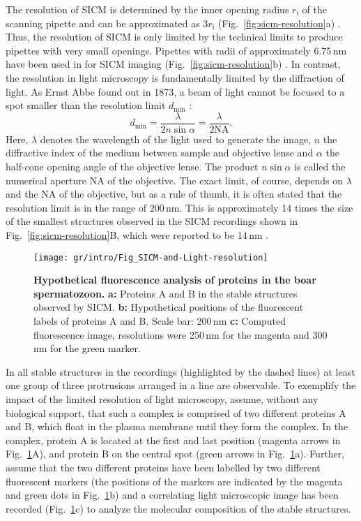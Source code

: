 The resolution of SICM is determined by the inner opening radius
$r_\mathrm{i}$ of the scanning pipette and can be approximated as
$3r_\mathrm{i}$ (Fig.~\ref{fig:sicm-resolution}a)
\cite{rheinlaender:094905,Rheinlaender2015}.  Thus, the resolution of SICM is
only limited by the technical limits to produce pipettes with very small
openings. Pipettes with radii of approximately 6.75\,nm have been used in for
SICM imaging (Fig.~\ref{fig:sicm-resolution}b) \cite{Shevchuk2006}. In
contrast, the resolution in light microscopy is fundamentally limited by the
diffraction of light. As Ernst Abbe found out in 1873, a beam of light cannot
be focused to a spot smaller than the resolution limit $d_\text{min}$
\cite{Abbe1873}:
\begin{equation}
  d_\text{min} = \frac\lambda{2n\sin\alpha} = \frac\lambda{2\mathrm{NA}}\text{.}
  \label{eq:diffraction-limit}
\end{equation}
Here, $\lambda$ denotes the wavelength of the light used to generate the
image, $n$ the diffractive index of the medium between sample and objective
lense and $\alpha$ the half-cone opening angle of the objective lense. The
product $n\sin\alpha$ is called the numerical aperture $\mathrm{NA}$ of the
objective. The exact limit, of course, depends on $\lambda$ and the NA of the
objective, but as a rule of thumb, it is often stated that the resolution
limit is in the range of 200\,nm. This is approximately 14 times the size of
the smallest structures observed in the SICM recordings shown in
Fig.~\ref{fig:sicm-resolution}B, which were reported to be 14\,nm
\cite{Shevchuk2006}.

\begin{figure}
  \sidecaption
  \texttt{[image: gr/intro/Fig\_SICM-and-Light-resolution]}%
  \caption{\textbf{Hypothetical fluorescence analysis of proteins in the boar
      spermatozoon.} \textbf{a:} Proteins A and B in the stable structures
    observed by SICM. \textbf{b:} Hypothetical positions of the fluorescent
    labels of proteins A and B. Scale bar: 200\,nm \textbf{c:} Computed
    fluorescence image, resolutions were 250\,nm for the magenta and 300\,nm
    for the green marker.}
  \label{fig:sicm-and-light-resolution}
\end{figure}
In all stable structures in the recordings (highlighted by the dashed lines)
at least one group of three protrusions arranged in a line are observable. To
exemplify the impact of the limited resolution of light microscopy, assume,
without any biological support, that such a complex is comprised of two
different proteins A and B, which float in the plasma membrane until they form
the complex. In the complex, protein A is located at the first and last
position (magenta arrows in Fig.~\ref{fig:sicm-and-light-resolution}A), and
protein B on the central spot (green arrows in
Fig.~\ref{fig:sicm-and-light-resolution}a). Further, assume that the two
different proteins have been labelled by two different fluorescent markers
(the positions of the markers are indicated by the magenta and green dots in
Fig.~\ref{fig:sicm-and-light-resolution}b) and a correlating light microscopic
image has been recorded (Fig.~\ref{fig:sicm-and-light-resolution}c) to analyze
the molecular composition of the stable structures.


